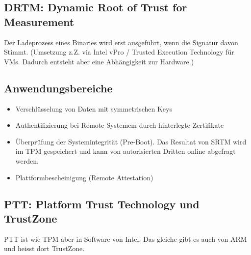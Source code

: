 \subsection{DRTM: Dynamic Root of Trust for Measurement}
Der Ladeprozess eines Binaries wird erst ausgeführt, wenn die Signatur davon Stimmt. (Umsetzung z.Z. via Intel vPro / Trusted Execution Technology für VMs. Dadurch entsteht aber eine Abhängigkeit zur Hardware.)

\subsection{Anwendungsbereiche}
\begin{itemize}
	\item Verschlüsselung von Daten mit symmetrischen Keys
	\item Authentifizierung bei Remote Systemem durch hinterlegte Zertifikate 
	\item Überprüfung der Systemintegrität (Pre-Boot). Das Resultat von SRTM wird im TPM gespeichert und kann von autorisierten Dritten online abgefragt werden. 
	\item Plattformbescheinigung (Remote Attestation)
\end{itemize}

\subsection{PTT: Platform Trust Technology und TrustZone}
PTT ist wie TPM aber in Software von Intel. Das gleiche gibt es auch von ARM und heisst dort TrustZone.

